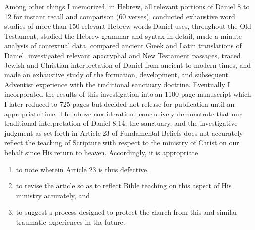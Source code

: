 Among other things I memorized, in Hebrew, all relevant portions of Daniel 8
to 12 for instant recall and comparison (60 verses), conducted exhaustive
word studies
of more than 150 relevant Hebrew words Daniel uses,
throughout the Old Testament, studied the Hebrew grammar and syntax in
detail, made a minute analysis of contextual data, compared ancient Greek
and Latin translations of Daniel, investigated relevant apocryphal and New
Testament passages, traced Jewish and Christian
interpretation of Daniel
from ancient to modern times,
and made an exhaustive study of the
formation, development, and subsequent Adventist experience with the
traditional sanctuary doctrine.
Eventually I incorporated the results of
this investigation into an 1100 page manuscript which I later reduced to 725
pages but decided not release for publication until an appropriate time.
\newpage
The above considerations conclusively demonstrate that our traditional
interpretation of Daniel 8:14, the sanctuary, and the investigative judgment
as set forth in Article 23 of Fundamental Beliefs does not accurately
reflect the teaching of Scripture with respect to the ministry of Christ on
our behalf since His return to heaven. Accordingly, 
it is appropriate
\begin{enumerate}
	\item to note wherein Article 23 is thus defective,
	\item to revise the article so
as to reflect Bible teaching on this aspect of His ministry accurately, and
	\item to suggest a process designed to protect the church from this and
similar traumatic experiences in the future.
\end{enumerate}

